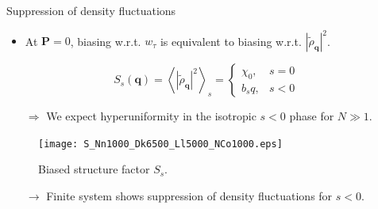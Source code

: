 \documentclass{beamer}
\begin{document}
{
\footerwithoutframenumber

\begin{frame}[noframenumbering]{Suppression of density fluctuations}


\vspace{-15pt}
\begin{itemize}
  \item At $\boldsymbol{P} = 0$, biasing w.r.t. $w_{\tau}$ is equivalent to biasing w.r.t. $|\tilde{\rho}_{\boldsymbol{q}}|^2$.
\end{itemize}

\begin{equation}
S_s(\boldsymbol{q}) = \left<|\tilde{\rho}_{\boldsymbol{q}}|^2\right>_s = \begin{cases} \chi_0, &s = 0 \\ b_s q, &s < 0 \end{cases}
\end{equation}
\begin{itemize}
  \item[$\Rightarrow$] We expect hyperuniformity in the isotropic $s < 0$ phase for $N \gg 1$.
\end{itemize}

\begin{figure}
\centering
\texttt{[image: S\_Nn1000\_Dk6500\_Ll5000\_NCo1000.eps]}
\caption{Biased structure factor $S_s$.}
\end{figure}

\vspace{-10pt}
\begin{itemize}
  \item[$\rightarrow$] Finite system shows suppression of density fluctuations for $s < 0$.
\end{itemize}

\end{frame}

}
\end{document}
